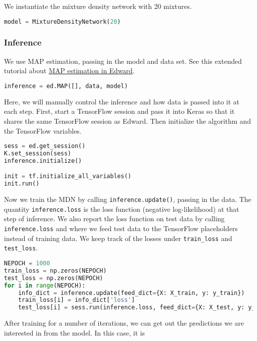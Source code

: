 We instantiate the mixture density network with 20 mixtures.

\begin{lstlisting}[language=Python]
model = MixtureDensityNetwork(20)
\end{lstlisting}

\subsubsection{Inference}

We use MAP estimation, passing
in the model and data set.
See this extended tutorial about
\href{/tutorials/map}{MAP estimation in Edward}.

\begin{lstlisting}[language=Python]
inference = ed.MAP([], data, model)
\end{lstlisting}

Here, we will manually control the inference and how data is passed
into it at each step. First, start a TensorFlow session and pass it
into Keras so that it shares the same TensorFlow session as Edward.
Then initialize the algorithm and the TensorFlow variables.

\begin{lstlisting}[language=Python]
sess = ed.get_session()
K.set_session(sess)
inference.initialize()

init = tf.initialize_all_variables()
init.run()
\end{lstlisting}

Now we train the MDN by calling \texttt{inference.update()}, passing
in the data. The quantity \texttt{inference.loss} is the
loss function (negative log-likelihood) at that step of inference. We
also report the loss function on test data by calling
\texttt{inference.loss} and where we feed test data to the TensorFlow
placeholders instead of training data.
We keep track of the losses under \texttt{train\_loss} and \texttt{test\_loss}.

\begin{lstlisting}[language=Python]
NEPOCH = 1000
train_loss = np.zeros(NEPOCH)
test_loss = np.zeros(NEPOCH)
for i in range(NEPOCH):
    info_dict = inference.update(feed_dict={X: X_train, y: y_train})
    train_loss[i] = info_dict['loss']
    test_loss[i] = sess.run(inference.loss, feed_dict={X: X_test, y: y_test})
\end{lstlisting}

After training for a number of iterations,
we can get out the predictions we are interested in from
the model. In this case, it is


